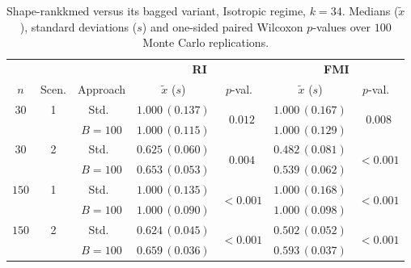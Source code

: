 \documentclass[11pt,a4paper]{article}
\begin{document}
\begin{table}[h]
\centering
\caption{Shape-rankkmed versus its bagged variant, Isotropic regime, $k=34$. Medians ($\tilde x$), standard deviations ($s$) and one-sided paired Wilcoxon $p$-values over $100$ Monte Carlo replications.}
\label{tab:rkm-iso-k34}
\footnotesize
\begin{tabular}{cc c cc cc}
\toprule
& & & \multicolumn{2}{c}{\textbf{RI}} & \multicolumn{2}{c}{\textbf{FMI}} \\
\cmidrule(lr){4-5}\cmidrule(lr){6-7}
$n$ & Scen. & Approach & $\tilde x$ ($s$) & $p$-val.\ & $\tilde x$ ($s$) & $p$-val.\ \\
\midrule
$30$ & 1 & Std.\ & $1.000\,(0.137)$ & \multirow{2}{*}{$\mathbf{0.012}$} & $1.000\,(0.167)$ & \multirow{2}{*}{$\mathbf{0.008}$} \\
     &   & $B{=}100$ & $1.000\,(0.115)$ & & $1.000\,(0.129)$ & \\
$30$ & 2 & Std.\ & $0.625\,(0.060)$ & \multirow{2}{*}{$\mathbf{0.004}$} & $0.482\,(0.081)$ & \multirow{2}{*}{$\mathbf{<\!0.001}$} \\
     &   & $B{=}100$ & $0.653\,(0.053)$ & & $0.539\,(0.062)$ & \\
$150$ & 1 & Std.\ & $1.000\,(0.135)$ & \multirow{2}{*}{$\mathbf{<\!0.001}$} & $1.000\,(0.168)$ & \multirow{2}{*}{$\mathbf{<\!0.001}$} \\
     &   & $B{=}100$ & $1.000\,(0.090)$ & & $1.000\,(0.098)$ & \\
$150$ & 2 & Std.\ & $0.624\,(0.045)$ & \multirow{2}{*}{$\mathbf{<\!0.001}$} & $0.502\,(0.052)$ & \multirow{2}{*}{$\mathbf{<\!0.001}$} \\
     &   & $B{=}100$ & $0.659\,(0.036)$ & & $0.593\,(0.037)$ & \\
\bottomrule
\end{tabular}
\end{table}
\end{document}
